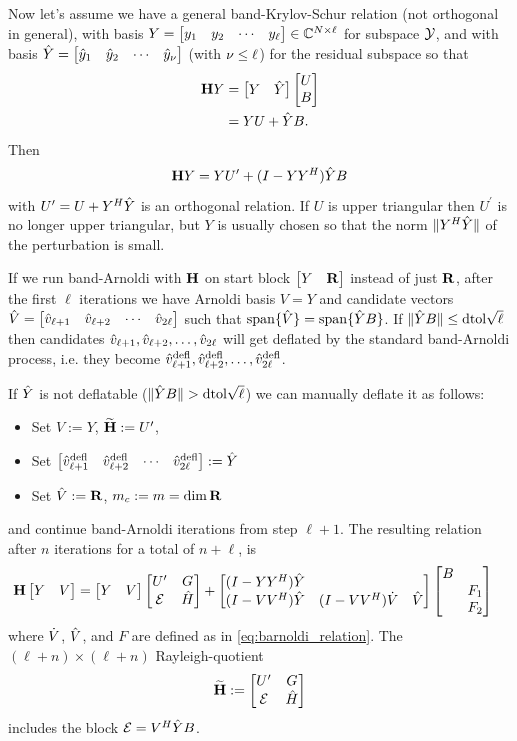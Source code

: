 Now let's assume we have a general band-Krylov-Schur relation (not orthogonal in general), with basis  $Y=\begin{bmatrix} y_1 & y_2 & \cdots & y_\ell\end{bmatrix}\in\mathbb{C}^{N\times \ell}$ for subspace $\mathcal{Y}$,  and with basis $\hat{Y}=\begin{bmatrix} \hat{y}_1 & \hat{y}_2 &\cdots&\hat{y}_\nu\end{bmatrix}$ (with $\nu\leq \ell$) for the residual subspace so that  
\begin{equation}
\begin{aligned}
\textbf{\textup{H}} Y &= \begin{bmatrix} Y & \hat{Y}\end{bmatrix}\begin{bmatrix} U\\  B\end{bmatrix}\\
&= Y U +  \hat{Y} B.
\label{eq:band_deflated_decomp}
\end{aligned}
\end{equation}
Then 
\begin{equation}
\textbf{\textup{H}} Y = Y U^\prime +  (I-YY^H)\hat{Y} B
\label{eq:band_deflated_decomp_orth}
\end{equation}
with $U^\prime=U+Y^H\hat{Y}$ is an orthogonal relation.    If $U$ is upper triangular then $U^\prime$ is no longer upper triangular, but $Y$ is usually chosen so that the norm $\| Y^H\hat{Y}\|$ of the perturbation is small.

If we run band-Arnoldi with $\textbf{\textup{H}}$ on start block $\begin{bmatrix} Y & \textbf{\textup{R}}\end{bmatrix}$  instead of just $\textbf{\textup{R}}$, after the first $\ell$ iterations we have Arnoldi basis $V = Y$ and candidate vectors $\hat{V} =\begin{bmatrix} \hat{v}_{\ell+1}&\hat{v}_{\ell+2}&\cdots&\hat{v}_{2\ell}\end{bmatrix}$ such that  $\operatorname*{span}\{ \hat{V} \} = \operatorname*{span}\{ \hat{Y} B \}$.  If $\| \hat{Y} B \| \leq \text{dtol}\sqrt{\ell}$ then candidates  $\hat{v}_{\ell+1},\hat{v}_{\ell+2},\ldots,\hat{v}_{2\ell}$ will get deflated by the standard  band-Arnoldi process, i.e. they become $\hat{v}^{\text{defl}}_{\ell+1},\hat{v}^{\text{defl}}_{\ell+2},\ldots,\hat{v}^{\text{defl}}_{2\ell}$.

If $ \hat{Y}$ is not deflatable ($\| \hat{Y} B \| > \text{dtol}\sqrt{\ell}$) we can manually  deflate it as follows:
\begin{itemize}
 \item Set $V:=Y$,  $\widetilde{\textbf{\textup{H}}}:=U^\prime$,
\item Set $\begin{bmatrix} \hat{v}^{\text{defl}}_{\ell+1} &\hat{v}^{\text{defl}}_{\ell+2}&\cdots&\hat{v}^{\text{defl}}_{2\ell}\end{bmatrix} := \hat{Y}$
\item  Set $\hat{V}:=\textbf{\textup{R}}$, $m_c: =m = \dim \textbf{\textup{R}}$   
\end{itemize}
and continue band-Arnoldi iterations from step $\ell+1$.
 The resulting relation after $n$ iterations for a total of $n+\ell$, is 
\begin{align}
\textbf{\textup{H}} \begin{bmatrix} Y&V\end{bmatrix} &= \begin{bmatrix} Y&V\end{bmatrix} \begin{bmatrix} U^\prime & G \\ \cal{E}&\hat{H}\end{bmatrix} 
+\begin{bmatrix} (I-YY^H)\hat{Y} & & \\
		(I-VV^H)\hat{Y} &(I-VV^H)\dot{V} & \hat{V} \end{bmatrix} 
\begin{bmatrix} B&\\&F_1\\&F_2\end{bmatrix}
\label{eq:thick_barnoldi_relation} 
\end{align}
 where $\dot{V}$, $\hat{V}$, and $F$ are defined as in \eqref{eq:barnoldi_relation}.
The $(\ell + n) \times (\ell + n)$ Rayleigh-quotient
\begin{equation}
\widetilde{\textbf{\textup{H}}} := \begin{bmatrix} U^\prime & G \\ \cal{E}&\hat{H}\end{bmatrix}
\label{eq:thick_band_rayleigh}
\end{equation}
includes the block $\mathcal{E}=V^H\hat{Y} B$.  

